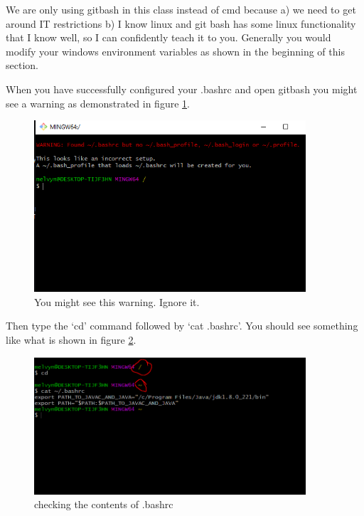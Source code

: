 \documentclass[12pt]{article}
\begin{document}
We are only using gitbash in this class instead of cmd because a) we need to get
around IT restrictions b) I know linux and git bash has some linux
functionality that I know well, so I can confidently teach it to you. Generally
you would modify your windows environment variables as shown in the beginning of
this section.

When you have successfully configured your .bashrc and open gitbash you might
see a warning as demonstrated in figure \ref{errorisokay}.

\begin{figure}[h]
  \centering
    \includegraphics[width=0.9\textwidth]{Images/errorIsOkay.PNG}
  \caption{You might see this warning. Ignore it.}
	\label{errorisokay}
\end{figure}

Then type the `cd' command followed by `cat .bashrc'. You should see something
like what is shown in figure \ref{cat}.

\begin{figure}[h]
  \centering
    \includegraphics[width=0.9\textwidth]{Images/catbashrc.PNG}
  \caption{checking the contents of .bashrc}
	\label{cat}
\end{figure}
\end{document}

